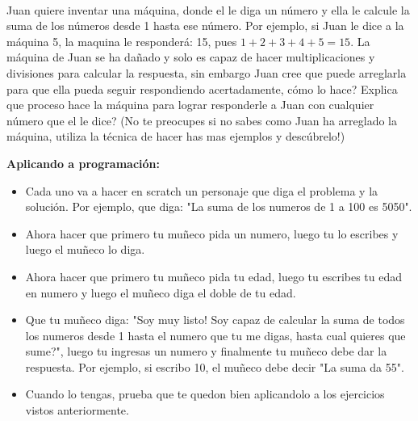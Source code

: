 \begin{exer}{\ \\}
	Juan quiere inventar una máquina, donde el le diga un número y ella le calcule la suma de los números desde 1 hasta ese número. Por ejemplo, si Juan le dice a la máquina 5, la maquina le responderá: 15, pues $1+2+3+4+5=15$. La máquina de Juan se ha dañado y solo es capaz de hacer multiplicaciones y divisiones para calcular la respuesta, sin embargo Juan cree que puede arreglarla para que ella pueda seguir respondiendo acertadamente, cómo lo hace? Explica que proceso hace la máquina para lograr responderle a Juan con cualquier número que el le dice? (No te preocupes si no sabes como Juan ha arreglado la máquina, utiliza la técnica de hacer has mas ejemplos y descúbrelo!)
\end{exer}

\begin{tcolorbox}[colback=black!5!white,colframe=black]
	\textbf{Aplicando a programación:}
	\begin{itemize}
		\item Cada uno va a hacer en scratch un personaje que diga el problema y la solución. Por ejemplo, que diga: "La suma de los numeros de 1 a 100 es 5050".
		\item Ahora hacer que primero tu muñeco pida un numero, luego tu lo escribes y luego el muñeco lo diga. 
		\item Ahora hacer que primero tu muñeco pida tu edad, luego tu escribes tu edad en numero y luego el muñeco diga el doble de tu edad. 
		\item Que tu muñeco diga: "Soy muy listo! Soy capaz de calcular la suma de todos los numeros desde 1 hasta el numero que tu me digas, hasta cual quieres que sume?", luego tu ingresas un numero y finalmente tu muñeco debe dar la respuesta. Por ejemplo, si escribo 10, el muñeco debe decir "La suma da 55".
		\item Cuando lo tengas, prueba que te quedon bien aplicandolo a los ejercicios vistos anteriormente.
	\end{itemize}
\end{tcolorbox}




		
		

